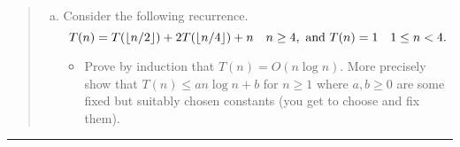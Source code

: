 \documentclass[11pt]{article}
\begin{document}





\begin{quote}
\begin{enumerate}[(a)]
\item Consider the following recurrence.
$$T(n) = T(\lfloor n/2 \rfloor) + 2T(\lfloor n/4 \rfloor) + n \quad n \ge 4, \mbox{~and~} T(n) = 1 \quad 1 \le n < 4. $$
\begin{itemize}
\item Prove by induction that $T(n) = O(n \log n)$.
More precisely show that $T(n) \le a n \log n + b$ for $n \ge 1$ where
$a,b \ge 0$ are some fixed but suitably chosen constants (you get to choose and fix them).

\end{itemize}
\end{enumerate}
\end{quote}
\hrule
\end{document}
